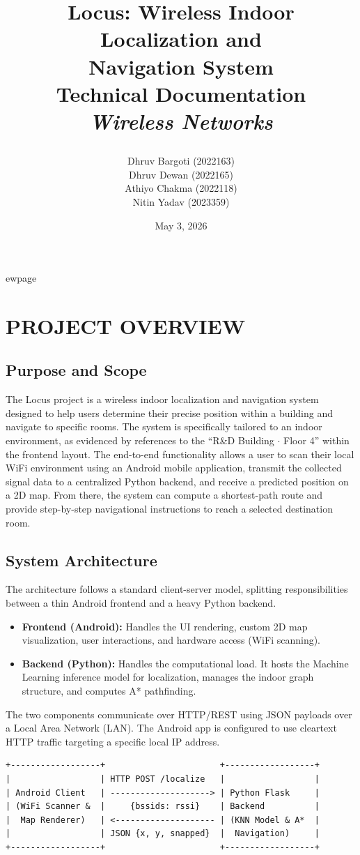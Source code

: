 \documentclass[11pt,a4paper]{article}
\title{
\textbf{\Large Locus: Wireless Indoor Localization and\\Navigation System}\\
\vspace{0.3cm}
\large Technical Documentation \\
\normalsize \textit{\textbf{Wireless Networks}}

}
\author{
Dhruv Bargoti (2022163)\\
Dhruv Dewan (2022165)\\
Athiyo Chakma (2022118)\\
Nitin Yadav (2023359)
}
\date{May 3, 2026}
\begin{document}
\maketitle
\tableofcontents
ewpage
\section{PROJECT OVERVIEW}
\subsection{Purpose and Scope}
The Locus project is a wireless indoor localization and navigation system designed to help users determine their precise position within a building and navigate to specific rooms. The system is specifically tailored to an indoor environment, as evidenced by references to the ``R\&D Building $\cdot$ Floor 4'' within the frontend layout. The end-to-end functionality allows a user to scan their local WiFi environment using an Android mobile application, transmit the collected signal data to a centralized Python backend, and receive a predicted position on a 2D map. From there, the system can compute a shortest-path route and provide step-by-step navigational instructions to reach a selected destination room.
\subsection{System Architecture}
The architecture follows a standard client-server model, splitting responsibilities between a thin Android frontend and a heavy Python backend.
\begin{itemize}
\item \textbf{Frontend (Android):} Handles the UI rendering, custom 2D map visualization, user interactions, and hardware access (WiFi scanning).
\item \textbf{Backend (Python):} Handles the computational load. It hosts the Machine Learning inference model for localization, manages the indoor graph structure, and computes A* pathfinding.
\end{itemize}
The two components communicate over HTTP/REST using JSON payloads over a Local Area Network (LAN). The Android app is configured to use cleartext HTTP traffic targeting a specific local IP address.
\begin{verbatim}
+------------------+                       +------------------+
|                  | HTTP POST /localize   |                  |
| Android Client   | --------------------> | Python Flask     |
| (WiFi Scanner &  |     {bssids: rssi}    | Backend          |
|  Map Renderer)   | <-------------------- | (KNN Model & A*  |
|                  | JSON {x, y, snapped}  |  Navigation)     |
+------------------+                       +------------------+
\end{verbatim}
\end{document}
